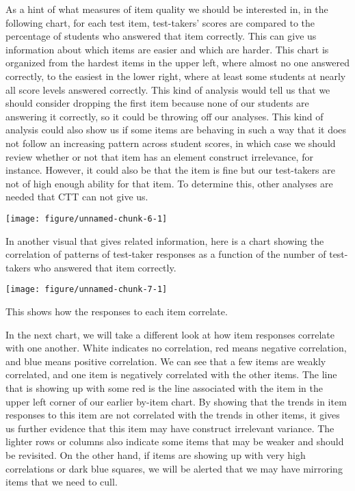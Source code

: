 \documentclass{article}\usepackage[]{graphicx}\usepackage[]{color}
\newenvironment{knitrout}{}{} %
\begin{document}
\begin{enumerate}
As a hint of what measures of item quality we should be interested in, in the following chart, for each test item, test-takers' scores are compared to the percentage of students who answered that item correctly. This can give us information about which items are easier and which are harder. This chart is organized from the hardest items in the upper left, where almost no one answered correctly, to the easiest in the lower right, where at least some students at nearly all score levels answered correctly. This kind of analysis would tell us that we should consider dropping the first item because none of our students are answering it correctly, so it could be throwing off our analyses. This kind of analysis could also show us if some items are behaving in such a way that it does not follow an increasing pattern across student scores, in which case we should review whether or not that item has an element construct irrelevance, for instance. However, it could also be that the item is fine but our test-takers are not of high enough ability for that item. To determine this, other analyses are needed that CTT can not give us.

\centering
\begin{knitrout}
\color{fgcolor}

{\centering \texttt{[image: figure/unnamed-chunk-6-1]} 

}



\end{knitrout}
\raggedright
In another visual that gives related information, here is a chart showing the correlation of patterns of test-taker responses as a function of the number of test-takers who answered that item correctly.

\centering
\begin{knitrout}
\color{fgcolor}

{\centering \texttt{[image: figure/unnamed-chunk-7-1]} 

}



\end{knitrout}
\raggedright
This shows how the responses to each item correlate. 

In the next chart, we will take a different look at how item responses correlate with one another. White indicates no correlation, red means negative correlation, and blue means positive correlation. We can see that a few items are weakly correlated, and one item is negatively correlated with the other items. The line that is showing up with some red is the line associated with the item in the upper left corner of our earlier by-item chart. By showing that the trends in item responses to this item are not correlated with the trends in other items, it gives us further evidence that this item may have construct irrelevant variance. The lighter rows or columns also indicate some items that may be weaker and should be revisited. On the other hand, if items are showing up with very high correlations or dark blue squares, we will be alerted that we may have mirroring items that we need to cull.


\end{enumerate}
\end{document}
